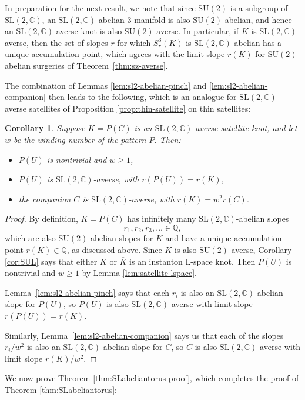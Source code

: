 \documentclass[11pt]{amsart}
\newtheorem {corollary}[theorem]{Corollary}
\numberwithin{equation}{section}
\numberwithin{theorem}{section}
\theoremstyle{definition}
\newcommand{\C}{\mathbb{C}}
\newcommand{\Q}{\mathbb{Q}}
\newcommand\SU{\mathrm{SU}}
\newcommand\SL{\mathrm{SL}}
\newcommand{\mirror}[1]{\overline{#1}}
\begin{document}
In preparation for the next result, we note that since $\SU(2)$ is a subgroup of $\SL(2,\C)$, an $\SL(2,\C)$-abelian 3-manifold is also $\SU(2)$-abelian, and hence an $\SL(2,\C)$-averse knot is also $\SU(2)$-averse. In particular, if $K$ is $\SL(2,\C)$-averse, then the set of slopes $r$ for which $S^3_r(K)$ is $\SL(2,\C)$-abelian has a unique accumulation point, which agrees with the limit slope $r(K)$ for $\SU(2)$-abelian surgeries of Theorem~\ref{thm:sz-averse}.

The combination of Lemmas \ref{lem:sl2-abelian-pinch} and \ref{lem:sl2-abelian-companion} then leads to the following, which is an analogue for $\SL(2,\C)$-averse satellites of Proposition \ref{prop:thin-satellite} on thin satellites:

\begin{corollary} \label{cor:sl2-averse-satellite}
Suppose  $K = P(C)$ is an $\SL(2,\C)$-averse satellite knot, and let $w$ be the winding number of the pattern $P$.  Then:
\begin{itemize}
\item $P(U)$ is nontrivial and $w \geq 1$,
\item $P(U)$ is $\SL(2,\C)$-averse, with $r(P(U)) = r(K)$,
\item the companion $C$ is $\SL(2,\C)$-averse, with $r(K) = w^2 r(C)$.
\end{itemize}
\end{corollary}

\begin{proof}
By definition, $K = P(C)$ has infinitely many $\SL(2,\C)$-abelian slopes \[r_1,r_2,r_3,\dots \in \Q,\] which are also $\SU(2)$-abelian slopes for $K$ and have a unique accumulation point $r(K) \in \Q$, as discussed above. Since $K$ is also $\SU(2)$-averse, Corollary \ref{cor:SUL} says that either $K$ or $\mirror{K}$ is an instanton L-space knot. Then $P(U)$ is nontrivial and $w\geq 1$ by Lemma \ref{lem:satellite-lspace}.

Lemma~\ref{lem:sl2-abelian-pinch} says that each $r_i$ is also an $\SL(2,\C)$-abelian slope for $P(U)$, so $P(U)$ is also $\SL(2,\C)$-averse with limit slope $r(P(U)) = r(K)$.

Similarly, Lemma~\ref{lem:sl2-abelian-companion} says us that each of the slopes $r_i/w^2$ is also an $\SL(2,\C)$-abelian slope for $C$, so $C$ is also $\SL(2,\C)$-averse with limit slope $r(K)/w^2$.
\end{proof}

We now prove Theorem \ref{thm:SLabeliantorus-proof}, which completes the proof of Theorem \ref{thm:SLabeliantorus}:
\end{document}
